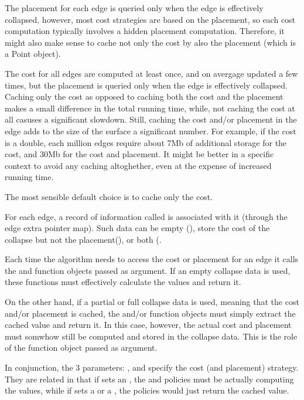 The placement for each edge is queried only when the edge is effectively collapsed, however, most cost strategies are based on the placement, so each cost computation typically involves a hidden placement computation. Therefore, it might also make sense to cache not only the cost by also the placement (which is a Point object).

The cost for all edges are computed at least once, and on avergage updated a few times, but the placement is queried only when the edge is effectively collapsed. Caching only the cost as opposed to caching both the cost and the placement makes a small difference in the total running time, while, not caching the cost at all casuses a significant slowdown. Still, caching the cost and/or placement in the edge adds to the size of the surface a significant number. For example, if the cost is a double, each million edges require about 7Mb of additional storage for the cost, and 30Mb for the cost and placement. It might be better in a specific context to avoid any caching altoghether, even at the expense of increased running time.

The most sensible default choice is to cache only the cost.

For each edge, a record of information called  is associated with it (through the edge extra pointer map). Such data can be empty (), store the cost of the collapse but not the placement(), or both (.

Each time the algorithm needs to access the cost or placement for an edge it calls the  and  function objects passed as argument. If an empty collapse data is used, these functions must effectively calculate the values and return it.

On the other hand, if a partial or full collapse data is used, meaning that the cost and/or placement is cached, the  and/or  function objects must simply extract the cached value and return it. In this case, however, the actual cost and placement must somwhow still be computed and stored in the collapse data. This is the role of the  function object passed as argument.

In conjunction, the 3 parameters: ,  and  specify the cost (and placement) strategy. They are related in that if  sets an , the  and  policies must be actually computing the values, while if  sets a  or a , the policies would just return the cached value.

